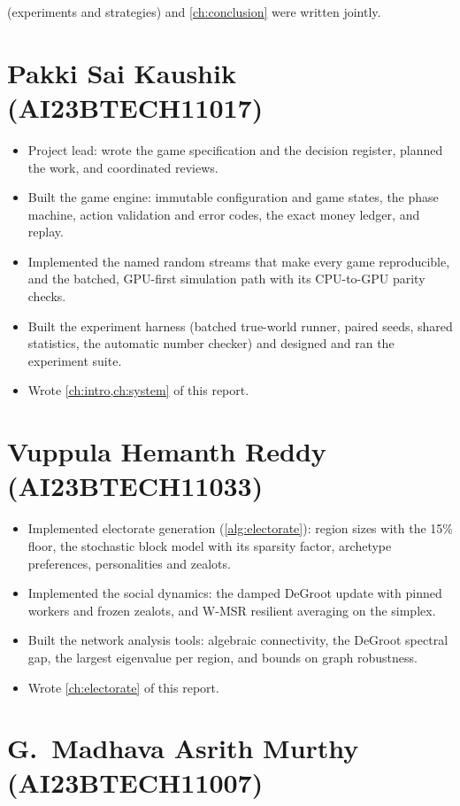 \documentclass[11pt,a4paper,oneside]{report}
\begin{document}
\noindent
{} (experiments and strategies) and \cref{ch:conclusion} were written jointly.

\section{Pakki Sai Kaushik (AI23BTECH11017)}

\begin{itemize}
  \item Project lead: wrote the game specification and the decision register, planned the work, and
        coordinated reviews.
  \item Built the game engine: immutable configuration and game states, the phase machine, action
        validation and error codes, the exact money ledger, and replay.
  \item Implemented the named random streams that make every game reproducible, and the batched,
        GPU-first simulation path with its CPU-to-GPU parity checks.
  \item Built the experiment harness (batched true-world runner, paired seeds, shared statistics, the
        automatic number checker) and designed and ran the experiment suite.
  \item Wrote \cref{ch:intro,ch:system} of this report.
\end{itemize}

\section{Vuppula Hemanth Reddy (AI23BTECH11033)}

\begin{itemize}
  \item Implemented electorate generation (\cref{alg:electorate}): region sizes with the 15\% floor, the
        stochastic block model with its sparsity factor, archetype preferences, personalities and zealots.
  \item Implemented the social dynamics: the damped DeGroot update with pinned workers and frozen zealots,
        and W-MSR resilient averaging on the simplex.
  \item Built the network analysis tools: algebraic connectivity, the DeGroot spectral gap, the largest
        eigenvalue per region, and bounds on graph robustness.
  \item Wrote \cref{ch:electorate} of this report.
\end{itemize}

\section{G.~Madhava Asrith Murthy (AI23BTECH11007)}
\end{document}
